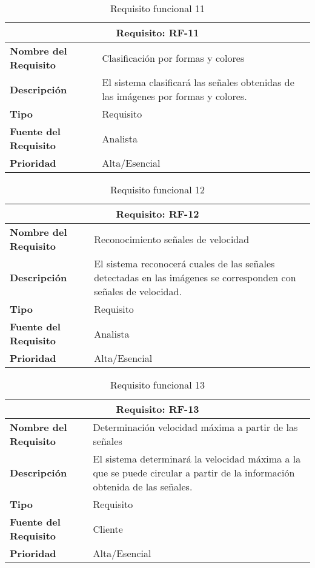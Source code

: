 \begin{table}[H]
\begin{center}
\begin{tabular}{p{} p{7cm}}
\multicolumn{2}{c}{\textbf{Requisito: RF-11} } \\
\hline \hline
\textbf{Nombre del Requisito} &  Clasificación por formas y colores\\
\hline
\textbf{Descripción} & El sistema clasificará las señales obtenidas de las imágenes por formas y colores.\\
\hline
\textbf{Tipo} & Requisito \\
\hline
\textbf{Fuente del Requisito} & Analista \\
\hline
\textbf{Prioridad} & Alta/Esencial \\ \hline
\end{tabular}
\caption{Requisito funcional 11}
\label{tab:RF-11}
\end{center}
\end{table}

\begin{table}[H]
\begin{center}
\begin{tabular}{p{} p{7cm}}
\multicolumn{2}{c}{\textbf{Requisito: RF-12} } \\
\hline \hline
\textbf{Nombre del Requisito} &  Reconocimiento señales de velocidad \\
\hline
\textbf{Descripción} & El sistema reconocerá cuales de las señales detectadas en las imágenes se corresponden con señales de velocidad.
\\
\hline
\textbf{Tipo} & Requisito \\
\hline
\textbf{Fuente del Requisito} & Analista \\
\hline
\textbf{Prioridad} & Alta/Esencial \\ \hline
\end{tabular}
\caption{Requisito funcional 12}
\label{tab:RF-12}
\end{center}
\end{table}

\begin{table}[H]
\begin{center}
\begin{tabular}{p{} p{7cm}}
\multicolumn{2}{c}{\textbf{Requisito: RF-13} } \\
\hline \hline
\textbf{Nombre del Requisito} & Determinación velocidad máxima a partir de las señales \\
\hline
\textbf{Descripción} & El sistema determinará la velocidad máxima a la que se puede circular a partir de la información obtenida de las señales.\\
\hline
\textbf{Tipo} & Requisito \\
\hline
\textbf{Fuente del Requisito} & Cliente \\
\hline
\textbf{Prioridad} & Alta/Esencial \\ \hline
\end{tabular}
\caption{Requisito funcional 13}
\label{tab:RF-13}
\end{center}
\end{table}

